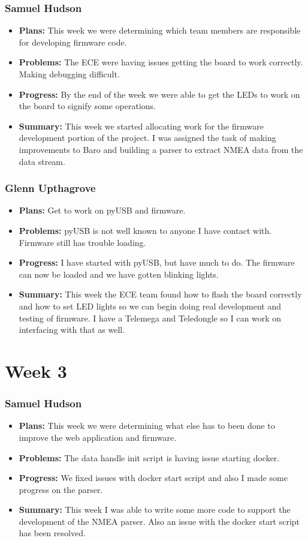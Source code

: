 \documentclass[onecolumn, draftclsnofoot,10pt, compsoc]{IEEEtran}
\begin{document}
\subsubsection{Samuel Hudson}
\begin {itemize}
 \item \textbf{Plans: }This week we were determining which team members are responsible for developing firmware code. 
 \item \textbf{Problems: }The ECE were having issues getting the board to work correctly. Making debugging difficult. 
 \item \textbf{Progress: }By the end of the week we were able to get the LEDs to work on the board to signify some operations. 
 \item \textbf{Summary: }This week we started allocating work for the firmware development portion of the project. I was assigned the task of making improvements to Baro and building a parser to extract NMEA data from the data stream.
\end {itemize}
\subsubsection{Glenn Upthagrove}
\begin {itemize}
 \item \textbf{Plans: }Get to work on pyUSB and firmware. 
 \item \textbf{Problems: }pyUSB is not well known to anyone I have contact with. Firmware still has trouble loading. 
 \item \textbf{Progress: }I have started with pyUSB, but have much to do. The firmware can now be loaded and we have gotten blinking lights.  
 \item \textbf{Summary: }This week the ECE team found how to flash the board correctly and how to set LED lights so we can begin doing real development and testing of firmware. I have a Telemega and Teledongle so I can work on interfacing with that as well.  
\end {itemize}

\section{Week 3}
\subsubsection{Samuel Hudson}
\begin {itemize}
 \item \textbf{Plans: }This week we were determining what else has to been done to improve the web application and firmware. 
 \item \textbf{Problems: }The data handle init script is having issue starting docker.
 \item \textbf{Progress: }We fixed issues with docker start script and also I made some progress on the parser.
 \item \textbf{Summary: }This week I was able to write some more code to support the development of the NMEA parser. Also an issue with the docker start script has been resolved.
\end {itemize}
\end{document}
